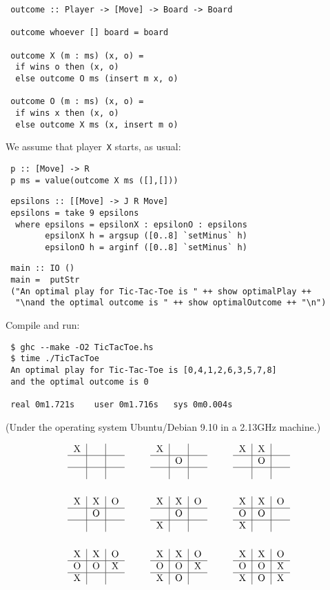 \documentclass%
[%
Screen4to3,
]{foils}
\begin{document}
\begin{verbatim}
 outcome :: Player -> [Move] -> Board -> Board

 outcome whoever [] board = board

 outcome X (m : ms) (x, o) = 
  if wins o then (x, o) 
  else outcome O ms (insert m x, o)

 outcome O (m : ms) (x, o) = 
  if wins x then (x, o) 
  else outcome X ms (x, insert m o)
\end{verbatim}

We assume that
player~\verb+X+ starts, as usual:
\begin{verbatim}
 p :: [Move] -> R
 p ms = value(outcome X ms ([],[]))
\end{verbatim}


\begin{verbatim}
 epsilons :: [[Move] -> J R Move]
 epsilons = take 9 epsilons
  where epsilons = epsilonX : epsilonO : epsilons
        epsilonX h = argsup ([0..8] `setMinus` h) 
        epsilonO h = arginf ([0..8] `setMinus` h) 
\end{verbatim}


\begin{verbatim}
 main :: IO ()
 main =  putStr 
 ("An optimal play for Tic-Tac-Toe is " ++ show optimalPlay ++ 
  "\nand the optimal outcome is " ++ show optimalOutcome ++ "\n")
\end{verbatim}
Compile and run:
\begin{verbatim}
 $ ghc --make -O2 TicTacToe.hs
 $ time ./TicTacToe
 An optimal play for Tic-Tac-Toe is [0,4,1,2,6,3,5,7,8]
 and the optimal outcome is 0

 real 0m1.721s    user 0m1.716s   sys 0m0.004s
\end{verbatim}
(Under the operating system Ubuntu/Debian 9.10 in a
2.13GHz machine.)


\newcommand{\X}{\text{X}}
\renewcommand{\O}{\text{O}}
\newcommand{\n}{\phantom{\O}}
\[
\begin{array}{ccc}
\play{\X}{\n}{\n}{\n}{\n}{\n}{\n}{\n}{\n} & \quad
\play{\X}{\n}{\n}{\n}{\O}{\n}{\n}{\n}{\n} & \quad
\play{\X}{\X}{\n}{\n}{\O}{\n}{\n}{\n}{\n} \\[7ex]

\play{\X}{\X}{\O}{\n}{\O}{\n}{\n}{\n}{\n} & \quad
\play{\X}{\X}{\O}{\n}{\O}{\n}{\X}{\n}{\n} & \quad
\play{\X}{\X}{\O}{\O}{\O}{\n}{\X}{\n}{\n} \\[7ex]

\play{\X}{\X}{\O}{\O}{\O}{\X}{\X}{\n}{\n} & \quad
\play{\X}{\X}{\O}{\O}{\O}{\X}{\X}{\O}{\n} & \quad
\play{\X}{\X}{\O}{\O}{\O}{\X}{\X}{\O}{\X}
\end{array}
\]
\end{document}
